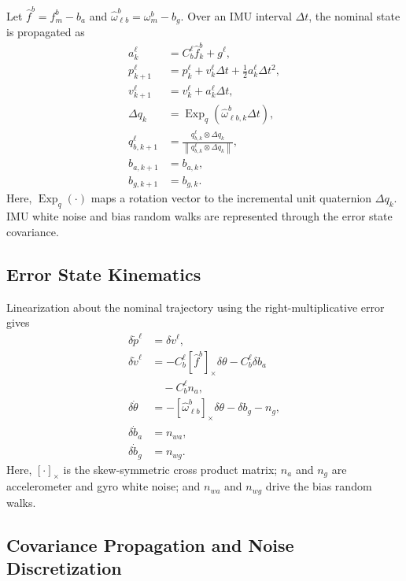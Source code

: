 \documentclass[]{IAC_style}
\begin{document}
Let $\hat f^b=f_m^b-b_a$ and $\hat\omega_{\ell b}^b=\omega_m^b-b_g$. Over an IMU interval $\Delta t$, the nominal state is propagated as
\begin{equation}
\tag{20}\label{eq:20}
\begin{aligned}
a_k^\ell&=C_b^\ell\hat f_k^b+g^\ell,\\
p_{k+1}^\ell&=p_k^\ell+v_k^\ell\Delta t
  +\tfrac12a_k^\ell\Delta t^2,\\
v_{k+1}^\ell&=v_k^\ell+a_k^\ell\Delta t,\\
\Delta q_k
  &=\operatorname{Exp}_q\!\left(
    \hat\omega_{\ell b,k}^b\Delta t\right),\\
q_{b,k+1}^\ell
  &=\frac{q_{b,k}^\ell\otimes\Delta q_k}
  {\left\lVert q_{b,k}^\ell\otimes\Delta q_k\right\rVert},\\
b_{a,k+1}&=b_{a,k},\\
b_{g,k+1}&=b_{g,k}.
\end{aligned}
\end{equation}
Here, $\operatorname{Exp}_q(\cdot)$ maps a rotation vector to the incremental unit quaternion $\Delta q_k$. IMU white noise and bias random walks are represented through the error state covariance.

\subsection{Error State Kinematics}

Linearization about the nominal trajectory using the right-multiplicative error gives
\begin{equation}
\tag{21}\label{eq:21}
\begin{aligned}
\delta\dot p^\ell&=\delta v^\ell,\\
\delta\dot v^\ell
  &=-C_b^\ell[\hat f^b]_\times\delta\theta-C_b^\ell\delta b_a\\
  &\quad{}-C_b^\ell n_a,\\
\delta\dot\theta
  &=-[\hat\omega_{\ell b}^b]_\times\delta\theta-\delta b_g-n_g,\\
\delta\dot b_a&=n_{wa},\\
\delta\dot b_g&=n_{wg}.
\end{aligned}
\end{equation}
Here, $[\cdot]_\times$ is the skew-symmetric cross product matrix; $n_a$ and $n_g$ are accelerometer and gyro white noise; and $n_{wa}$ and $n_{wg}$ drive the bias random walks.

\subsection{Covariance Propagation and Noise Discretization}
\end{document}
